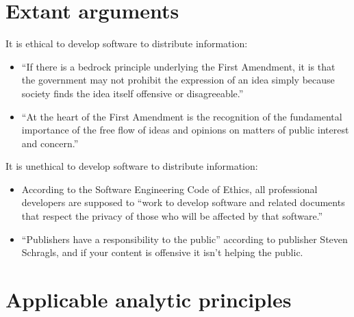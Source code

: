 \documentclass[11pt]{article}
\begin{document}
\section{Extant arguments}

It is ethical to develop software to distribute information:
\begin{itemize}
\item ``If there is a bedrock principle underlying the First Amendment, it is that the government may not prohibit the expression of an idea simply because society finds the idea itself offensive or disagreeable.'' \cite[414]{1989texas}
\item ``At the heart of the First Amendment is the recognition of the fundamental importance of the free flow of ideas and opinions on matters of public interest and concern.'' \cite[51]{1988hustler}
\end{itemize}
It is unethical to develop software to distribute information:
\begin{itemize}
\item According to the Software Engineering Code of Ethics, all professional developers are supposed to ``work to develop software and related documents that respect the privacy of those who will be affected by that software.'' \cite[3.12]{secode}
\item ``Publishers have a responsibility to the public'' according to publisher Steven Schragls, and if your content is offensive it isn't helping the public. \cite[46]{hawker}
\end{itemize}

\section{Applicable analytic principles}
\end{document}

